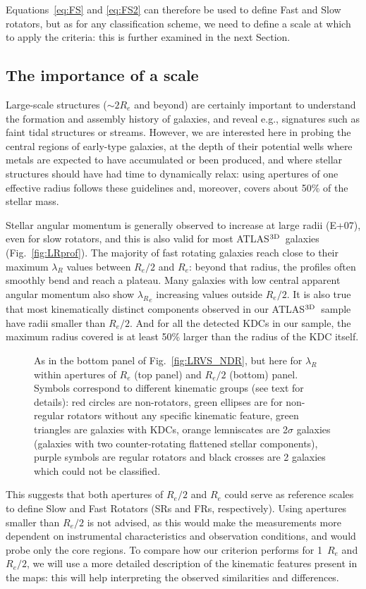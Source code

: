 \documentclass[useAMS,usenatbib,usegraphicx]{mn2e}
\newcommand{\atlas}{{ATLAS$^{\rm 3D}$}}
\begin{document}
Equations~\ref{eq:FS} and \ref{eq:FS2} can therefore be used to define Fast and Slow
rotators, but as for any classification scheme, we need to define
a scale at which to apply the criteria: this is further examined in the next Section.

\subsection{The importance of a scale}
\label{sec:scale}

Large-scale structures ($\sim 2 R_e$ and beyond) are certainly important to understand the formation and
assembly history of galaxies, and reveal e.g., signatures such as faint tidal structures or streams. 
However, we are interested here in probing the central regions of early-type galaxies,
at the depth of their potential wells where metals are expected to have accumulated or been produced, 
and where stellar structures should have had time to dynamically relax: using
apertures of one effective radius follows these guidelines and, moreover, covers
about 50\% of the stellar mass.

Stellar angular momentum is generally observed to increase at large radii (E+07), 
even for slow rotators, and this is also valid for most \atlas\ galaxies (Fig.~\ref{fig:LRprof}).
The majority of fast rotating galaxies reach close to their maximum $\lambda_R$ values between
$R_e/2$ and $R_e$: beyond that radius, the profiles often smoothly bend and reach a
plateau. Many galaxies with low central apparent angular momentum also show 
${\lambda_R}_{e}$ increasing values outside $R_e/2$. 
It is also true that most kinematically distinct components observed 
in our \atlas\ sample have radii smaller than $R_e/2$. And for all the 
detected KDCs in our sample, the maximum radius covered is at least 50\% larger 
than the radius of the KDC itself. 
\begin{figure}
\centering
{}
\caption{As in the bottom panel of Fig.~\ref{fig:LRVS_NDR}, but here for $\lambda_R$ within apertures
of $R_e$ (top panel) and $R_e /2$ (bottom) panel. Symbols correspond to
different kinematic groups (see text for details): red circles are non-rotators,
green ellipses are for non-regular rotators without any specific kinematic feature, green triangles
are galaxies with KDCs, orange lemniscates are 2$\sigma$ galaxies (galaxies
with two counter-rotating flattened stellar components), purple
symbols are regular rotators and black crosses are 2 galaxies which could not be
classified.}
\label{fig:LRLR2_Flag}
\end{figure}
This suggests that both apertures of $R_e / 2$ and $R_e$ could serve as
reference scales to define Slow and Fast Rotators (SRs and FRs, respectively). Using apertures smaller than
$R_e/2$ is not advised, as this would make the measurements more dependent on
instrumental characteristics and observation conditions, and would probe 
only the core regions. To compare how our criterion performs for 1~$R_e$
and $R_e / 2$, we will use a more detailed description of the kinematic features 
present in the maps: this will help interpreting the observed similarities and differences.
\end{document}
